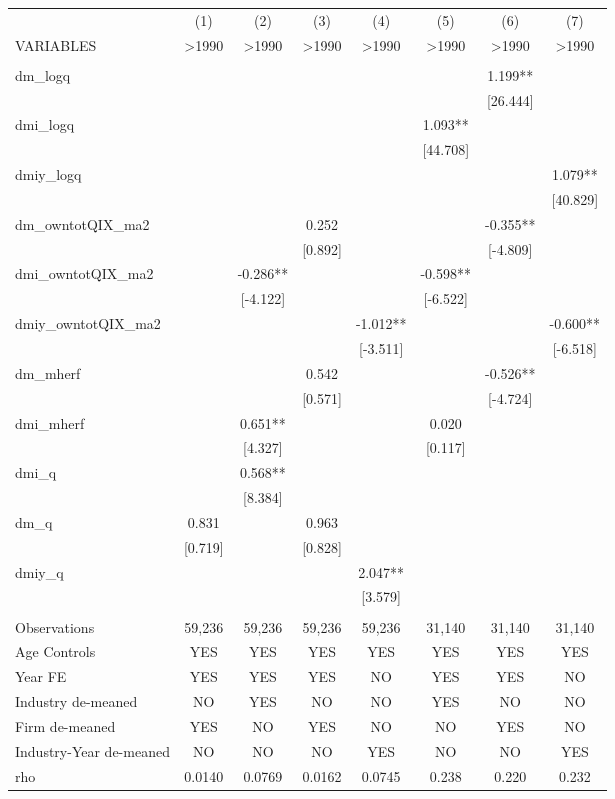\documentclass[]{article}
\begin{document}
\begin{tabular}{lccccccc} \hline
 & (1) & (2) & (3) & (4) & (5) & (6) & (7) \\
VARIABLES & >1990 & >1990 & >1990 & >1990 & >1990 & >1990 & >1990 \\ \hline
 &  &  &  &  &  &  &  \\
dm\_logq &  &  &  &  &  & 1.199** &  \\
 &  &  &  &  &  & [26.444] &  \\
dmi\_logq &  &  &  &  & 1.093** &  &  \\
 &  &  &  &  & [44.708] &  &  \\
dmiy\_logq &  &  &  &  &  &  & 1.079** \\
 &  &  &  &  &  &  & [40.829] \\
dm\_owntotQIX\_ma2 &  &  & 0.252 &  &  & -0.355** &  \\
 &  &  & [0.892] &  &  & [-4.809] &  \\
dmi\_owntotQIX\_ma2 &  & -0.286** &  &  & -0.598** &  &  \\
 &  & [-4.122] &  &  & [-6.522] &  &  \\
dmiy\_owntotQIX\_ma2 &  &  &  & -1.012** &  &  & -0.600** \\
 &  &  &  & [-3.511] &  &  & [-6.518] \\
dm\_mherf &  &  & 0.542 &  &  & -0.526** &  \\
 &  &  & [0.571] &  &  & [-4.724] &  \\
dmi\_mherf &  & 0.651** &  &  & 0.020 &  &  \\
 &  & [4.327] &  &  & [0.117] &  &  \\
dmi\_q &  & 0.568** &  &  &  &  &  \\
 &  & [8.384] &  &  &  &  &  \\
dm\_q & 0.831 &  & 0.963 &  &  &  &  \\
 & [0.719] &  & [0.828] &  &  &  &  \\
dmiy\_q &  &  &  & 2.047** &  &  &  \\
 &  &  &  & [3.579] &  &  &  \\
 &  &  &  &  &  &  &  \\
Observations & 59,236 & 59,236 & 59,236 & 59,236 & 31,140 & 31,140 & 31,140 \\
Age Controls & YES & YES & YES & YES & YES & YES & YES \\
Year FE & YES & YES & YES & NO & YES & YES & NO \\
Industry de-meaned & NO & YES & NO & NO & YES & NO & NO \\
Firm de-meaned & YES & NO & YES & NO & NO & YES & NO \\
Industry-Year de-meaned & NO & NO & NO & YES & NO & NO & YES \\
 rho & 0.0140 & 0.0769 & 0.0162 & 0.0745 & 0.238 & 0.220 & 0.232 \\ \hline
\end{tabular}
\end{document}
